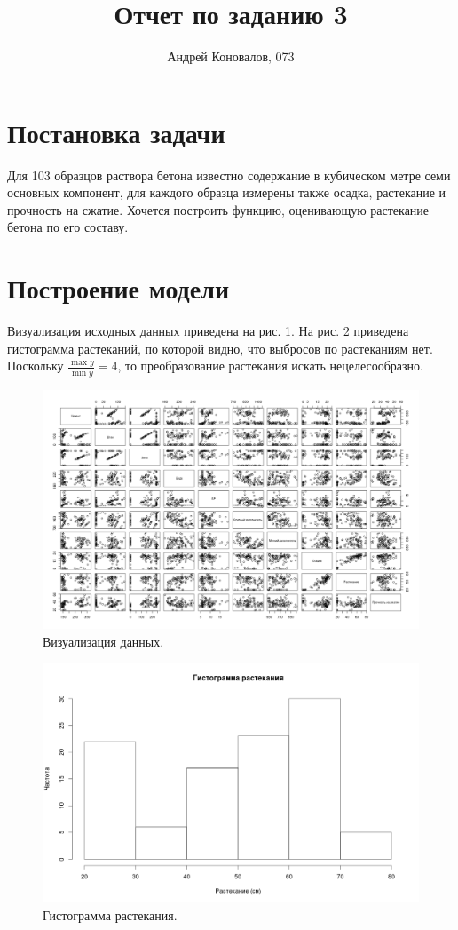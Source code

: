 \documentclass[10pt]{article}
\title{Отчет по заданию 3}
\author{Андрей Коновалов, 073}
\date{}
\begin{document}
\maketitle

\section{Постановка задачи}

Для 103 образцов раствора бетона известно содержание в кубическом метре семи основных компонент, для каждого образца измерены также осадка, растекание и прочность на сжатие.
Хочется построить функцию, оценивающую растекание бетона по его составу.

\section{Построение модели}

Визуализация исходных данных приведена на рис. 1.
На рис. 2 приведена гистограмма растеканий, по которой видно, что выбросов по растеканиям нет.
Поскольку $\frac{\max y}{\min y} = 4$, то преобразование растекания искать нецелесообразно.

\begin{figure}[h]
  \centering
  \includegraphics[scale=0.33]{visualization.png}
  \caption{Визуализация данных.}
\end{figure}

\begin{figure}[h]
  \centering
  \includegraphics[scale=0.4]{hist.png}
  \caption{Гистограмма растекания.}
\end{figure}
\end{document}
